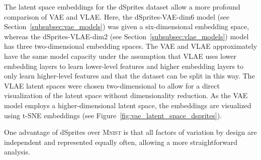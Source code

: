 The latent space embeddings for the dSprites dataset allow a more profound comparison of \ac{VAE} and \ac{VLAE}.
Here, the dSprites-\ac{VAE}-dim6 model (see Section~\ref{subsubsec:vae_models}) was given a six-dimensional embedding space, whereas the dSprites-\ac{VLAE}-dim2 (see Section~\ref{subsubsec:vlae_models}) model has three two-dimensional embedding spaces.
The \ac{VAE} and \ac{VLAE} approximately have the same model capacity under the assumption that \ac{VLAE} uses lower embedding layers to learn lower-level features and higher embedding layers to only learn higher-level features and that the dataset can be split in this way.
The \ac{VLAE} latent spaces were chosen two-dimensional to allow for a direct visualization of the latent space without dimensionality reduction.
As the \ac{VAE} model employs a higher-dimensional latent space, the embeddings are visualized using \ac{t-SNE} embeddings (see Figure~\ref{fig:vae_latent_space_dsprites}).

One advantage of dSprites over \textsc{Mnist} is that all factors of variation by design are independent and represented equally often, allowing a more straightforward analysis.

